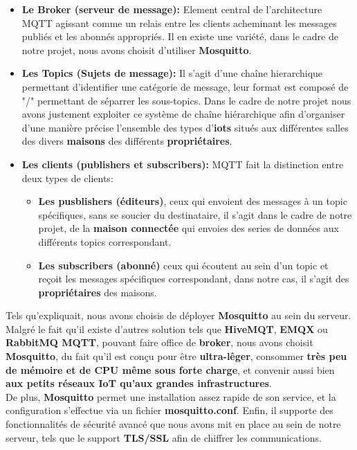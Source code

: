 \documentclass[10pt, a4paper]{report}
\begin{document}
	\begin{itemize}
		\item \textbf{Le Broker (serveur de message):} Element central de l'architecture MQTT agissant comme un relais entre les clients acheminant les messages publiés et les abonnés appropriés. Il en existe une variété, dans le cadre de notre projet, nous avons choisit d'utiliser \textbf{Mosquitto}.
		
		\item \textbf{Les Topics (Sujets de message):} Il s'agit d'une chaîne hierarchique permettant d'identifier une catégorie de message, leur format est composé de "/" permettant de séparrer les sous-topics. Dans le cadre de notre projet nous avons justement exploiter ce système de chaîne hiérarchique afin d'organiser d'une manière précise l'ensemble des types d'\textbf{iots} situés aux différentes salles des divers \textbf{maisons} des différents \textbf{propriétaires}. 
		
		\item \textbf{Les clients (publishers et subscribers):} MQTT fait la distinction entre deux types de clients: 
		\begin{itemize}
			\item \textbf{Les pusblishers (éditeurs)}, ceux qui envoient des messages à un topic spécifiques, sans se soucier du destinataire, il s'agit dans le cadre de notre projet, de la \textbf{maison connectée} qui envoies des series de données aux différents topics correspondant. 
			
			\item \textbf{Les subscribers (abonné)} ceux qui écoutent au sein d'un topic et reçoit les messages spécifiques correspondant, dans notre cas, il s'agit des \textbf{propriétaires} des maisons.
		\end{itemize}
	\end{itemize}
	\vspace{0.5cm}
	Tels qu'expliquait, nous avons choisis de déployer \textbf{Mosquitto} au sein du serveur. Malgré le fait qu'il existe d'autres solution tels que \textbf{HiveMQT}, \textbf{EMQX} ou \textbf{RabbitMQ MQTT}, pouvant faire office de \textbf{broker}, nous avons choisit \textbf{Mosquitto}, du fait qu'il est conçu pour être \textbf{ultra-lêger}, consommer \textbf{très peu de mémoire et de CPU même sous forte charge}, et convenir aussi bien \textbf{aux petits réseaux IoT qu'aux grandes infrastructures}.\\
	De plus, \textbf{Mosquitto} permet une installation assez rapide de son service, et la configuration s'effectue via un fichier \textbf{mosquitto.conf}. Enfin, il supporte des fonctionnalités de sécurité avancé que nous avons mit en place au sein de notre serveur, tels que le support \textbf{TLS/SSL} afin de chiffrer les communications.\\
\end{document}
